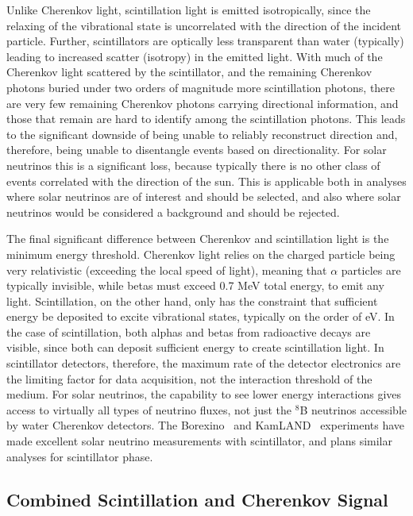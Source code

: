Unlike Cherenkov light, scintillation light is emitted isotropically, since the relaxing of the vibrational state is uncorrelated with the direction of the incident particle.
Further, scintillators are optically less transparent than water (typically) leading to increased scatter (isotropy) in the emitted light.
With much of the Cherenkov light scattered by the scintillator, and the remaining Cherenkov photons buried under two orders of magnitude more scintillation photons, there are very few remaining Cherenkov photons carrying directional information, and those that remain are hard to identify among the scintillation photons.
This leads to the significant downside of being unable to reliably reconstruct direction and, therefore, being unable to disentangle events based on directionality. 
For solar neutrinos this is a significant loss, because typically there is no other class of events correlated with the direction of the sun.
This is applicable both in analyses where solar neutrinos are of interest and should be selected, and also where solar neutrinos would be considered a background and should be rejected.

The final significant difference between Cherenkov and scintillation light is the minimum energy threshold.
Cherenkov light relies on the charged particle being very relativistic (exceeding the local speed of light), meaning that $\alpha$ particles are typically invisible, while betas must exceed 0.7 MeV total energy, to emit any light.
Scintillation, on the other hand, only has the constraint that sufficient energy be deposited to excite vibrational states, typically on the order of eV.
In the case of scintillation, both alphas and betas from radioactive decays are visible, since both can deposit sufficient energy to create scintillation light.
In scintillator detectors, therefore, the maximum rate of the detector electronics are the limiting factor for data acquisition, not the interaction threshold of the medium.
For solar neutrinos, the capability to see lower energy interactions gives access to virtually all types of neutrino fluxes, not just the $^8$B neutrinos accessible by water Cherenkov detectors.
The Borexino~\cite{borexino} and KamLAND~\cite{kamland} experiments have made excellent solar neutrino measurements with scintillator, and {\snop} plans similar analyses for scintillator phase.

\subsection{Combined Scintillation and Cherenkov Signal}

